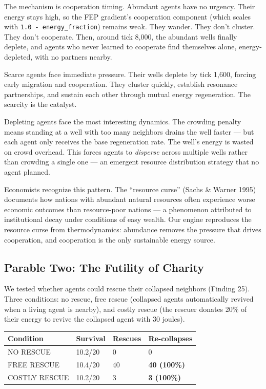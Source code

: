 The mechanism is cooperation timing. Abundant agents have no urgency. Their energy stays high, so the FEP gradient's cooperation component (which scales with \texttt{1.0\ -\ energy\_fraction}) remains weak. They wander. They don't cluster. They don't cooperate. Then, around tick 8,000, the abundant wells finally deplete, and agents who never learned to cooperate find themselves alone, energy-depleted, with no partners nearby.

Scarce agents face immediate pressure. Their wells deplete by tick 1,600, forcing early migration and cooperation. They cluster quickly, establish resonance partnerships, and sustain each other through mutual energy regeneration. The scarcity is the catalyst.

Depleting agents face the most interesting dynamics. The crowding penalty means standing at a well with too many neighbors drains the well faster --- but each agent only receives the base regeneration rate. The well's energy is wasted on crowd overhead. This forces agents to \emph{disperse} across multiple wells rather than crowding a single one --- an emergent resource distribution strategy that no agent planned.

Economists recognize this pattern. The ``resource curse'' (Sachs \& Warner 1995) documents how nations with abundant natural resources often experience worse economic outcomes than resource-poor nations --- a phenomenon attributed to institutional decay under conditions of easy wealth. Our engine reproduces the resource curse from thermodynamics: abundance removes the pressure that drives cooperation, and cooperation is the only sustainable energy source.

\subsection{Parable Two: The Futility of Charity}\label{parable-two-the-futility-of-charity}

We tested whether agents could rescue their collapsed neighbors (Finding 25). Three conditions: no rescue, free rescue (collapsed agents automatically revived when a living agent is nearby), and costly rescue (the rescuer donates 20\% of their energy to revive the collapsed agent with 30 joules).

\begin{longtable}[]{@{}llll@{}}
\toprule\noalign{}
Condition & Survival & Rescues & Re-collapses \\
\midrule\noalign{}
\endhead
\bottomrule\noalign{}
\endlastfoot
NO RESCUE & 10.2/20 & 0 & 0 \\
FREE RESCUE & 10.4/20 & 40 & \textbf{40 (100\%)} \\
COSTLY RESCUE & 10.2/20 & 3 & \textbf{3 (100\%)} \\
\end{longtable}

